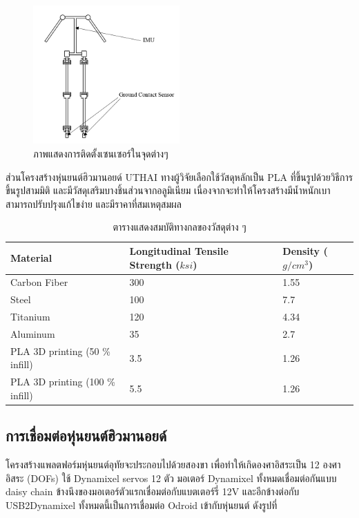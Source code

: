 \begin{figure}[ht]
    \centering
    \includegraphics[width=0.5\textwidth]{chapter3/images/uthai_sensor.PNG}
    \caption{ภาพแสดงการติดตั้งเซนเซอร์ในจุดต่างๆ}
    \label{fig:uthai_structure2}
\end{figure}

ส่วนโครงสร้างหุ่นยนต์ฮิวมานอยด์ UTHAI ทางผู้วิจัยเลือกใช้วัสดุหลักเป็น PLA ที่ขึ้นรูปด้วยวิธีการขึ้นรูปสามมิติ
และมีวัสดุเสริมบางชิ้นส่วนจากอลูมิเนียม เนื่องจากจะทำให้โครงสร้างมีน้ำหนักเบา สามารถปรับปรุงแก้ไขง่าย และมีราคาที่สมเหตุสมผล
\begin{table}[ht]
	\centering
	\begin{tabular}{| l | l | l |}
		\hline
		Material & Longitudinal Tensile Strength ($ksi$) & Density ($g/cm^3$) \\
        \hline
        Carbon Fiber & 300 & 1.55 \\
        Steel & 100	& 7.7 \\
        Titanium & 120 & 4.34 \\
        Aluminum & 35 & 2.7 \\
        PLA 3D printing (50 \% infill) & 3.5 & 1.26 \\
        PLA 3D printing (100 \% infill) & 5.5 & 1.26 \\
	    \hline
	\end{tabular}
	\caption{ตารางแสดงสมบัติทางกลของวัสดุต่าง ๆ}
	\label{tab:material_properties}
\end{table}

\subsection{การเชื่อมต่อหุ่นยนต์ฮิวมานอยด์}
โครงสร้างแพลตฟอร์มหุ่นยนต์อุทัยจะประกอบไปด้วยสองขา เพื่อทำให้เกิดองศาอิสระเป็น 12 องศาอิสระ
(DOFs) ใช้ Dynamixel servos 12 ตัว มอเตอร์ Dynamixel ทั้งหมดเชื่อมต่อกันแบบ daisy chain
ข้างนึงของมอเตอร์ตัวแรกเชื่อมต่อกับแบตเตอร์รี่ 12V และอีกข้างต่อกับ USB2Dynamixel
ทั้งหมดนี้เป็นการเชื่อมต่อ Odroid เข้ากับหุ่นยนต์ ดังรูปที่ %

